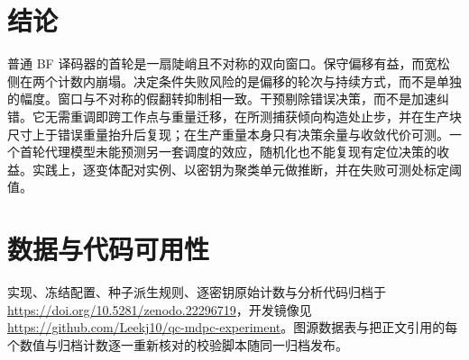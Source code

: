 \documentclass[UTF8,a4paper,10pt,twocolumn]{ctexart}
\begin{document}
\section{结论}\label{sec:conclusion}

普通 BF 译码器的首轮是一扇陡峭且不对称的双向窗口。保守偏移有益，而宽松侧在两个计数内崩塌。决定条件失败风险的是偏移的轮次与持续方式，而不是单独的幅度。窗口与不对称的假翻转抑制相一致。干预剔除错误决策，而不是加速纠错。它无需重调即跨工作点与重量迁移，在所测捕获倾向构造处止步，并在生产块尺寸上于错误重量抬升后复现；在生产重量本身只有决策余量与收敛代价可测。一个首轮代理模型未能预测另一套调度的效应，随机化也不能复现有定位决策的收益。实践上，逐变体配对实例、以密钥为聚类单元做推断，并在失败可测处标定阈值。
\section*{数据与代码可用性}
实现、冻结配置、种子派生规则、逐密钥原始计数与分析代码归档于 \url{https://doi.org/10.5281/zenodo.22296719}，开发镜像见 \url{https://github.com/Leekj10/qc-mdpc-experiment}。图源数据表与把正文引用的每个数值与归档计数逐一重新核对的校验脚本随同一归档发布。



\end{document}
